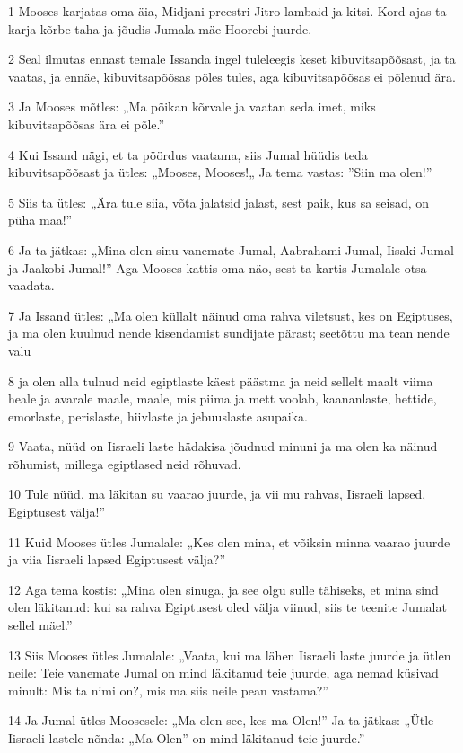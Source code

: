 \par 1 Mooses karjatas oma äia, Midjani preestri Jitro lambaid ja kitsi. Kord ajas ta karja kõrbe taha ja jõudis Jumala mäe Hoorebi juurde.
\par 2 Seal ilmutas ennast temale Issanda ingel tuleleegis keset kibuvitsapõõsast, ja ta vaatas, ja ennäe, kibuvitsapõõsas põles tules, aga kibuvitsapõõsas ei põlenud ära.
\par 3 Ja Mooses mõtles: „Ma põikan kõrvale ja vaatan seda imet, miks kibuvitsapõõsas ära ei põle.”
\par 4 Kui Issand nägi, et ta pöördus vaatama, siis Jumal hüüdis teda kibuvitsapõõsast ja ütles: „Mooses, Mooses!„ Ja tema vastas: ”Siin ma olen!”
\par 5 Siis ta ütles: „Ära tule siia, võta jalatsid jalast, sest paik, kus sa seisad, on püha maa!”
\par 6 Ja ta jätkas: „Mina olen sinu vanemate Jumal, Aabrahami Jumal, Iisaki Jumal ja Jaakobi Jumal!” Aga Mooses kattis oma näo, sest ta kartis Jumalale otsa vaadata.
\par 7 Ja Issand ütles: „Ma olen küllalt näinud oma rahva viletsust, kes on Egiptuses, ja ma olen kuulnud nende kisendamist sundijate pärast; seetõttu ma tean nende valu
\par 8 ja olen alla tulnud neid egiptlaste käest päästma ja neid sellelt maalt viima heale ja avarale maale, maale, mis piima ja mett voolab, kaananlaste, hettide, emorlaste, perislaste, hiivlaste ja jebuuslaste asupaika.
\par 9 Vaata, nüüd on Iisraeli laste hädakisa jõudnud minuni ja ma olen ka näinud rõhumist, millega egiptlased neid rõhuvad.
\par 10 Tule nüüd, ma läkitan su vaarao juurde, ja vii mu rahvas, Iisraeli lapsed, Egiptusest välja!”
\par 11 Kuid Mooses ütles Jumalale: „Kes olen mina, et võiksin minna vaarao juurde ja viia Iisraeli lapsed Egiptusest välja?”
\par 12 Aga tema kostis: „Mina olen sinuga, ja see olgu sulle tähiseks, et mina sind olen läkitanud: kui sa rahva Egiptusest oled välja viinud, siis te teenite Jumalat sellel mäel.”
\par 13 Siis Mooses ütles Jumalale: „Vaata, kui ma lähen Iisraeli laste juurde ja ütlen neile: Teie vanemate Jumal on mind läkitanud teie juurde, aga nemad küsivad minult: Mis ta nimi on?, mis ma siis neile pean vastama?”
\par 14 Ja Jumal ütles Moosesele: „Ma olen see, kes ma Olen!” Ja ta jätkas: „Ütle Iisraeli lastele nõnda: „Ma Olen” on mind läkitanud teie juurde.”
